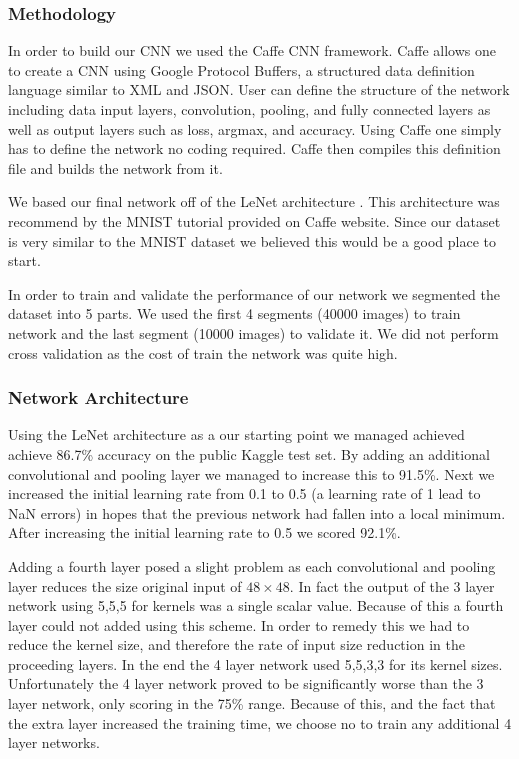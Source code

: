 \documentclass[10pt,twocolumn]{article}
\begin{document}
\subsubsection{Methodology}
In order to build our CNN we used the Caffe CNN framework\cite{jia2014caffe}. Caffe allows one to create a CNN using Google Protocol Buffers, a structured data definition language similar to XML and JSON. User can define the structure of the network including data input layers, convolution, pooling, and fully connected layers as well as output layers such as loss, argmax, and accuracy. Using Caffe one simply has to define the network no coding required. Caffe then compiles this definition file and builds the network from it.

We based our final network off of the LeNet architecture \cite{lecun-01a}. This architecture was recommend by the MNIST tutorial provided on Caffe website. Since our dataset is very similar to the MNIST dataset we believed this would be a good place to start. 

In order to train and validate the performance of our network we segmented the dataset into 5 parts. We used the first 4 segments (40000 images) to train network and the last segment (10000 images) to validate it. We did not perform cross validation as the cost of train the network was quite high. 
\subsubsection{Network Architecture}
Using the LeNet architecture as a our starting point we managed achieved achieve 86.7\% accuracy on the public Kaggle test set. By adding an additional convolutional and pooling layer we managed to increase this to 91.5\%. Next we increased the initial learning rate from 0.1 to 0.5 (a learning rate of 1 lead to NaN errors) in hopes that the previous network had fallen into a local minimum. After increasing the initial learning rate to 0.5 we scored 92.1\%. 

Adding a fourth layer posed a slight problem as each convolutional and pooling layer reduces the size original input of $48 \times 48$. In fact the output of the 3 layer network using 5,5,5 for kernels was a single scalar value. Because of this a fourth layer could not added using this scheme. In order to remedy this we had to reduce the kernel size, and therefore the rate of input size reduction in the proceeding layers. In the end the 4 layer network used 5,5,3,3 for its kernel sizes. Unfortunately the 4 layer network proved to be significantly worse than the 3 layer network, only scoring in the 75\% range. Because of this, and the fact that the extra layer increased the training time, we choose no to train any additional 4 layer networks.
\end{document}
